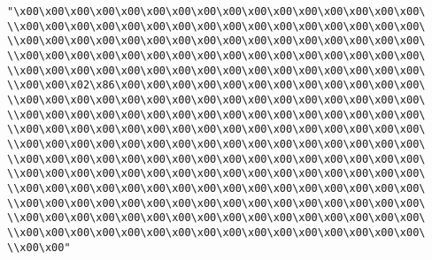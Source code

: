 \verb|"\x00\x00\x00\x00\x00\x00\x00\x00\x00\x00\x00\x00\x00\x00\x00\x00\|\newline
\verb|\\x00\x00\x00\x00\x00\x00\x00\x00\x00\x00\x00\x00\x00\x00\x00\x00\|\newline
\verb|\\x00\x00\x00\x00\x00\x00\x00\x00\x00\x00\x00\x00\x00\x00\x00\x00\|\newline
\verb|\\x00\x00\x00\x00\x00\x00\x00\x00\x00\x00\x00\x00\x00\x00\x00\x00\|\newline
\verb|\\x00\x00\x00\x00\x00\x00\x00\x00\x00\x00\x00\x00\x00\x00\x00\x00\|\newline
\verb|\\x00\x00\x02\x86\x00\x00\x00\x00\x00\x00\x00\x00\x00\x00\x00\x00\|\newline
\verb|\\x00\x00\x00\x00\x00\x00\x00\x00\x00\x00\x00\x00\x00\x00\x00\x00\|\newline
\verb|\\x00\x00\x00\x00\x00\x00\x00\x00\x00\x00\x00\x00\x00\x00\x00\x00\|\newline
\verb|\\x00\x00\x00\x00\x00\x00\x00\x00\x00\x00\x00\x00\x00\x00\x00\x00\|\newline
\verb|\\x00\x00\x00\x00\x00\x00\x00\x00\x00\x00\x00\x00\x00\x00\x00\x00\|\newline
\verb|\\x00\x00\x00\x00\x00\x00\x00\x00\x00\x00\x00\x00\x00\x00\x00\x00\|\newline
\verb|\\x00\x00\x00\x00\x00\x00\x00\x00\x00\x00\x00\x00\x00\x00\x00\x00\|\newline
\verb|\\x00\x00\x00\x00\x00\x00\x00\x00\x00\x00\x00\x00\x00\x00\x00\x00\|\newline
\verb|\\x00\x00\x00\x00\x00\x00\x00\x00\x00\x00\x00\x00\x00\x00\x00\x00\|\newline
\verb|\\x00\x00\x00\x00\x00\x00\x00\x00\x00\x00\x00\x00\x00\x00\x00\x00\|\newline
\verb|\\x00\x00\x00\x00\x00\x00\x00\x00\x00\x00\x00\x00\x00\x00\x00\x00\|\newline
\verb|\\x00\x00"|\newline
